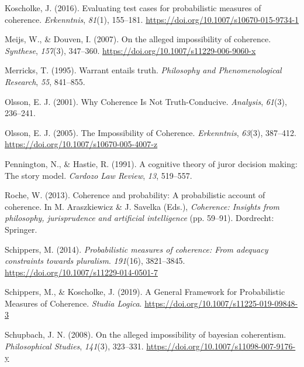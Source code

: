 \documentclass[
  10pt,
]{scrartcl}
\newlength{\cslhangindent}
\newlength{\cslentryspacingunit} %
\newenvironment{CSLReferences}[2] %
 {%
  \setlength{\parindent}{0pt}
  \ifodd #1
  \let\oldpar\par
  \def\par{\hangindent=\cslhangindent\oldpar}
  \fi
  \setlength{\parskip}{#2\cslentryspacingunit}
 }%
 {}
\begin{document}
\begin{CSLReferences}{1}{0}
\leavevmode{}%
Koscholke, J. (2016). Evaluating test cases for probabilistic measures of coherence. \emph{Erkenntnis}, \emph{81}(1), 155--181. \url{https://doi.org/10.1007/s10670-015-9734-1}

\leavevmode{}%
Meijs, W., \& Douven, I. (2007). On the alleged impossibility of coherence. \emph{Synthese}, \emph{157}(3), 347--360. \url{https://doi.org/10.1007/s11229-006-9060-x}

\leavevmode{}%
Merricks, T. (1995). Warrant entails truth. \emph{Philosophy and Phenomenological Research}, \emph{55}, 841--855.

\leavevmode{}%
Olsson, E. J. (2001). Why {Coherence Is Not Truth}-{Conducive}. \emph{Analysis}, \emph{61}(3), 236--241.

\leavevmode{}%
Olsson, E. J. (2005). The {Impossibility} of {Coherence}. \emph{Erkenntnis}, \emph{63}(3), 387--412. \url{https://doi.org/10.1007/s10670-005-4007-z}

\leavevmode{}%
Pennington, N., \& Hastie, R. (1991). A cognitive theory of juror decision making: The story model. \emph{Cardozo Law Review}, \emph{13}, 519--557.

\leavevmode{}%
Roche, W. (2013). Coherence and probability: A probabilistic account of coherence. In M. Araszkiewicz \& J. Savelka (Eds.), \emph{Coherence: Insights from philosophy, jurisprudence and artificial intelligence} (pp. 59--91). Dordrecht: Springer.

\leavevmode{}%
Schippers, M. (2014). \emph{Probabilistic measures of coherence: From adequacy constraints towards pluralism}. \emph{191}(16), 3821--3845. \url{https://doi.org/10.1007/s11229-014-0501-7}

\leavevmode{}%
Schippers, M., \& Koscholke, J. (2019). A {General Framework} for {Probabilistic Measures} of {Coherence}. \emph{Studia Logica}. \url{https://doi.org/10.1007/s11225-019-09848-3}

\leavevmode{}%
Schupbach, J. N. (2008). On the alleged impossibility of bayesian coherentism. \emph{Philosophical Studies}, \emph{141}(3), 323--331. \url{https://doi.org/10.1007/s11098-007-9176-y}


\end{CSLReferences}
\end{document}
